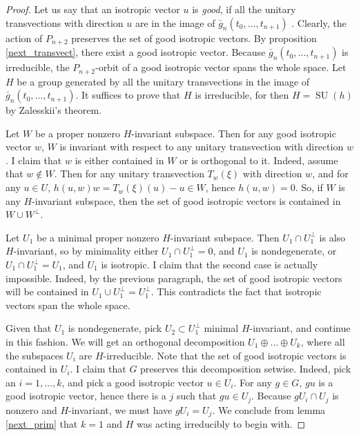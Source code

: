 \documentclass{article}
\theoremstyle{definition}
\DeclareMathOperator{\SU}{\mathrm{SU}}
\begin{document}
	\begin{proof}
			Let us say that an isotropic vector $u$ is \emph{good}, if all the unitary transvections with direction $u$ are in the image of $\bar{g}_n(t_0, \ldots, t_{n+1})$ . Clearly, the action of $P_{n+2}$ preserves the set of good isotropic vectors. By proposition \ref{next_transvect}, there exist a good isotropic vector. Because $\bar{g}_n(t_0, \ldots, t_{n+1})$ is irreducible, the $P_{n+2}$-orbit of a good isotropic vector spans the whole space. Let $H$ be a group generated by all the unitary transvections in the image of $\bar{g}_n(t_0, \ldots, t_{n+1})$. It suffices to prove that $H$ is irreducible, for then $H=\SU(h)$ by Zalesskii's theorem. \par 
			Let $W$ be a proper nonzero $H$-invariant subspace. Then for any good isotropic vector $w$, $W$ is invariant with respect to any unitary transvection with direction $w$. I claim that $w$ is either contained in $W$ or is orthogonal to it. Indeed, assume that $w \not \in W$. Then for any unitary transvection $T_w(\xi)$ with direction $w$, and for any $u \in U$, $h(u,w) w = T_w(\xi)(u)-u \in W$, hence $h(u,w)=0$. So, if $W$ is any $H$-invariant subspace, then the set of good isotropic vectors is contained in $W \cup W^{\perp}$.  \par 
			Let $U_1$ be a minimal proper nonzero $H$-invariant subspace. Then $U_1 \cap U_1^{\perp}$ is also $H$-invariant, so by minimality either $U_1 \cap U_1^{\perp} = 0$, and $U_1$ is nondegenerate, or $U_1 \cap U_1^{\perp} = U_1$, and $U_1$ is isotropic. I claim that the second case is actually impossible. Indeed, by the previous paragraph, the set of good isotropic vectors will be contained in $U_1 \cup U_1^{\perp} = U_1^{\perp}$. This contradicts the fact that isotropic vectors span the whole space.
			\par 
			Given that $U_1$ is nondegenerate, pick $U_2 \subset U_1^{\perp}$ minimal $H$-invariant, and continue in this fashion. We will get an orthogonal decomposition $U_1 \oplus \ldots \oplus U_k$, where all the subspaces $U_i$ are $H$-irreducible. Note that the set of good isotropic vectors is contained in $U_i$. I claim that $G$ preserves this decomposition setwise. Indeed, pick an $i = 1, \ldots, k$, and pick a good isotropic vector $u \in U_i$. For any $g \in G$, $gu$ is a good isotropic vector, hence there is a $j$ such that $gu \in U_j$. Because $gU_i \cap U_j$ is nonzero and $H$-invariant, we must have $gU_i = U_j$. We conclude from lemma \ref{next_prim} that $k=1$ and $H$ was acting irreducibly to begin with.
	\end{proof}
\end{document}
